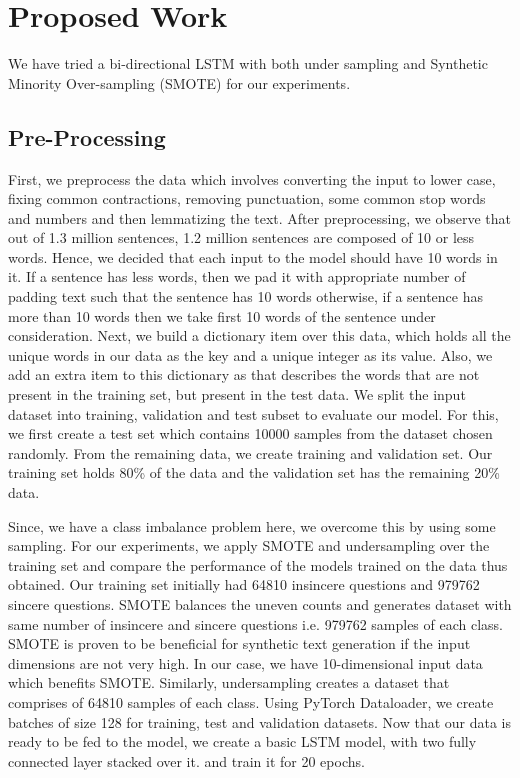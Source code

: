 \section{Proposed Work}
We have tried a bi-directional LSTM with both under sampling and Synthetic Minority Over-sampling (SMOTE) for our experiments. 
\subsection{Pre-Processing}
First, we preprocess the data which involves converting the input to lower case, fixing common contractions, removing punctuation, some common stop words and numbers and then lemmatizing the text. \newline
After preprocessing, we observe that out of 1.3 million sentences, 1.2 million sentences are composed of 10 or less words. Hence, we decided that each input to the model should have 10 words in it. If a sentence has less words, then we pad it with appropriate number of padding text such that the sentence has 10 words otherwise, if a sentence has more than 10 words then we take first 10 words of the sentence under consideration. \newline
Next, we build a dictionary item over this data, which holds all the unique words in our data as the key and a unique integer as its value. Also, we add an extra item to this dictionary as  that describes the words that are not present in the training set, but present in the test data.\newline
We split the input dataset into training, validation and test subset to evaluate our model. For this, we first create a test set which contains 10000 samples from the dataset chosen randomly. From the remaining data, we create training and validation set. Our training set holds 80\% of the data and the validation set has the remaining 20\% data.\par
Since, we have a class imbalance problem here, we overcome this by using some sampling. For our experiments, we apply SMOTE and undersampling over the training set and compare the performance of the models trained on the data thus obtained. Our training set initially had 64810 insincere questions and 979762 sincere questions. SMOTE balances the uneven counts and generates dataset with same number of insincere and sincere questions i.e. 979762 samples of each class. SMOTE is proven to be beneficial for synthetic text generation if the input dimensions are not very high. In our case, we have 10-dimensional input data which benefits SMOTE. Similarly, undersampling creates a dataset that comprises of 64810 samples of each class. Using PyTorch Dataloader, we create batches of size 128 for training, test and validation datasets. Now that our data is ready to be fed to the model, we create a basic LSTM model, with two fully connected layer stacked over it. and train it for 20 epochs.\newline
